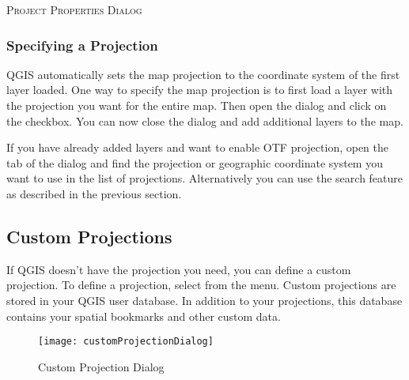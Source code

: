 \begin{Tip}
 \caption{\textsc{Project Properties Dialog}}
\end{Tip}

\subsubsection{Specifying a Projection}
\label{sec:projection-specifying}

QGIS automatically sets the map projection to the coordinate system of the
first layer loaded. One way to specify the map projection is to first load a
layer with the projection you want for the entire map. Then open the
 dialog and click on the  checkbox. You can now close the  dialog
and add additional layers to the map. 

If you have already added layers and want to enable OTF projection, open the 
 tab of the  dialog and find the projection or geographic
coordinate system you want to use in the list of projections. Alternatively
you can use the search feature as described in the previous section.

\subsection{Custom Projections}\label{sec:customprojections}

If QGIS doesn't have the projection you need, you can define a custom
projection. To define a projection, select  from
the  menu. Custom projections are stored in your QGIS user
database. In addition to your projections, this database contains your spatial
bookmarks and other custom data. 

\begin{figure}[ht]
   \begin{center}
   \caption{Custom Projection Dialog \nixcaption}\label{fig:customprojections}\smallskip
   \texttt{[image: customProjectionDialog]}
\end{center}  
\end{figure}


